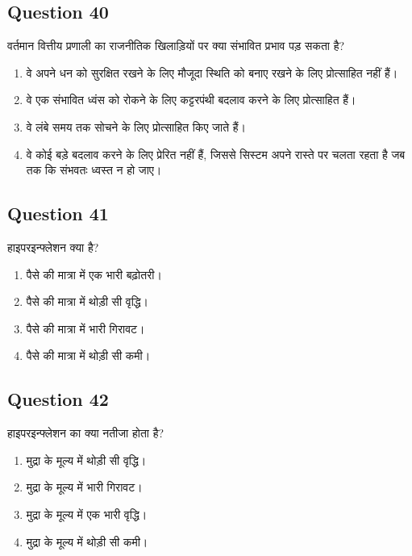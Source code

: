 \documentclass[12pt,a4paper]{article}
\begin{document}
\bigskip


\subsection*{Question 40}
वर्तमान वित्तीय प्रणाली का राजनीतिक खिलाड़ियों पर क्या संभावित प्रभाव पड़ सकता है?

\begin{enumerate}[label=\Alph*., leftmargin=*]
\item वे अपने धन को सुरक्षित रखने के लिए मौजूदा स्थिति को बनाए रखने के लिए प्रोत्साहित नहीं हैं।
\item वे एक संभावित ध्वंस को रोकने के लिए कट्टरपंथी बदलाव करने के लिए प्रोत्साहित हैं।
\item वे लंबे समय तक सोचने के लिए प्रोत्साहित किए जाते हैं।
\item वे कोई बड़े बदलाव करने के लिए प्रेरित नहीं हैं, जिससे सिस्टम अपने रास्ते पर चलता रहता है जब तक कि संभवतः ध्वस्त न हो जाए।
\end{enumerate}

\bigskip


\subsection*{Question 41}
हाइपरइन्फ्लेशन क्या है?

\begin{enumerate}[label=\Alph*., leftmargin=*]
\item पैसे की मात्रा में एक भारी बढ़ोतरी।
\item पैसे की मात्रा में थोड़ी सी वृद्धि।
\item पैसे की मात्रा में भारी गिरावट।
\item पैसे की मात्रा में थोड़ी सी कमी।
\end{enumerate}

\bigskip


\subsection*{Question 42}
हाइपरइन्फ्लेशन का क्या नतीजा होता है?

\begin{enumerate}[label=\Alph*., leftmargin=*]
\item मुद्रा के मूल्य में थोड़ी सी वृद्धि।
\item मुद्रा के मूल्य में भारी गिरावट।
\item मुद्रा के मूल्य में एक भारी वृद्धि।
\item मुद्रा के मूल्य में थोड़ी सी कमी।
\end{enumerate}
\end{document}
